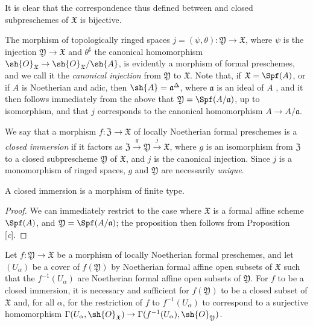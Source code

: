 It is clear that the correspondence thus defined between  and closed subpreschemes of $\mathfrak{X}$ is bijective.

The morphism of topologically ringed spaces $j=(\psi,\theta):\mathfrak{Y}\to\mathfrak{X}$, where $\psi$ is the injection $\mathfrak{Y}\to\mathfrak{X}$ and $\theta^\sharp$ the canonical homomorphism $\sh{O}_\mathfrak{X}\to\sh{O}_\mathfrak{X}/\sh{A}$, is evidently  a morphism of formal preschemes, and we call it the \emph{canonical injection} from $\mathfrak{Y}$ to $\mathfrak{X}$.
Note that, if $\mathfrak{X}=\Spf(A)$, or if $A$ is Noetherian and adic, then $\sh{A}=\mathfrak{a}^\Delta$, where $\mathfrak{a}$ is an ideal of $A$ , and it then follows immediately from the above that $\mathfrak{Y}=\Spf(A/\mathfrak{a})$, up to isomorphism, and that $j$ corresponds  to the canonical homomorphism $A\to A/\mathfrak{a}$.

We say that a morphism $f:\mathfrak{Z}\to\mathfrak{X}$ of locally Noetherian formal preschemes is a \emph{closed immersion} if it factors as $\mathfrak{Z}\xrightarrow{g}\mathfrak{Y}\xrightarrow{j}\mathfrak{X}$, where $g$ is an isomorphism from $\mathfrak{Z}$ to a closed subprescheme $\mathfrak{Y}$ of $\mathfrak{X}$, and $j$ is the canonical injection.
Since $j$ is a monomorphism of ringed spaces, $g$ and $\mathfrak{Y}$ are necessarily \emph{unique}.

\begin{proposition}[10.14.3]
\label{I.10.14.3}
A closed immersion is a morphism of finite type.
\end{proposition}

\begin{proof}
We can immediately restrict to the case where $\mathfrak{X}$ is a formal affine scheme $\Spf(A)$, and $\mathfrak{Y}=\Spf(A/\mathfrak{a})$;
the proposition then follows from Proposition [\emph{c}].
\end{proof}

\begin{lemma}[10.14.4]
\label{I.10.14.4}
Let $f:\mathfrak{Y}\to\mathfrak{X}$ be a morphism of locally Noetherian formal preschemes, and let $(U_\alpha)$ be a cover of $f(\mathfrak{Y})$ by Noetherian formal affine open subsets of $\mathfrak{X}$ such that the $f^{-1}(U_\alpha)$ are Noetherian formal affine open subsets of $\mathfrak{Y}$.
For $f$ to be a closed immersion, it is necessary and sufficient for $f(\mathfrak{Y})$ to be a closed subset of $\mathfrak{X}$ and, for all $\alpha$, for the restriction of $f$ to $f^{-1}(U_\alpha)$ to correspond  to a surjective homomorphism $\Gamma(U_\alpha,\sh{O}_\mathfrak{X})\to\Gamma(f^{-1}(U_\alpha),\sh{O}_\mathfrak{Y})$.
\end{lemma}

